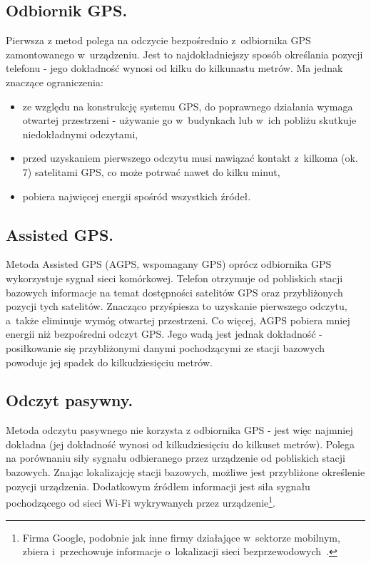 \documentclass[a4paper,twocolumn,11pt]{article}
\begin{document}
\subsection{Odbiornik GPS.}
 Pierwsza z metod polega na odczycie bezpośrednio z~odbiornika GPS zamontowanego w~urządzeniu.
 Jest to najdokładniejszy sposób określania pozycji telefonu - jego dokładność wynosi od kilku do kilkunastu metrów.
 Ma jednak znaczące ograniczenia:
 \begin{itemize}
  \item ze względu na konstrukcję systemu GPS, do poprawnego działania wymaga otwartej przestrzeni - używanie go w~budynkach lub w~ich pobliżu skutkuje niedokładnymi odczytami,
  \item przed uzyskaniem pierwszego odczytu musi nawiązać kontakt z~kilkoma (ok. 7) satelitami GPS, co może potrwać nawet do kilku minut,
  \item pobiera najwięcej energii spośród wszystkich źródeł.
 \end{itemize}


\subsection{Assisted GPS.}
 Metoda Assisted GPS (AGPS, wspomagany GPS) oprócz odbiornika GPS wykorzystuje sygnał sieci komórkowej.
 Telefon otrzymuje od pobliskich stacji bazowych informacje na temat dostępności satelitów GPS oraz przybliżonych pozycji tych satelitów.
 Znacząco przyśpiesza to uzyskanie pierwszego odczytu, a~także eliminuje wymóg otwartej przestrzeni.
 Co więcej, AGPS pobiera mniej energii niż bezpośredni odczyt GPS.
 Jego wadą jest jednak dokładność - posiłkowanie się przybliżonymi danymi pochodzącymi ze stacji bazowych powoduje jej spadek do kilkudziesięciu metrów.


\subsection{Odczyt pasywny.}
 Metoda odczytu pasywnego nie korzysta z odbiornika GPS - jest więc najmniej dokładna (jej dokładność wynosi od kilkudziesięciu do kilkuset metrów).
 Polega na porównaniu siły sygnału odbieranego przez urządzenie od pobliskich stacji bazowych.
 Znając lokalizajcję stacji bazowych, możliwe jest przybliżone określenie pozycji urządzenia.
 Dodatkowym źródłem informacji jest siła sygnału pochodzącego od sieci Wi-Fi wykrywanych przez urządzenie\footnote{Firma Google, podobnie jak inne firmy działające w~sektorze mobilnym, zbiera i~przechowuje informacje o~lokalizacji sieci bezprzewodowych~\cite{wifi:loc}.}.\\
\end{document}
